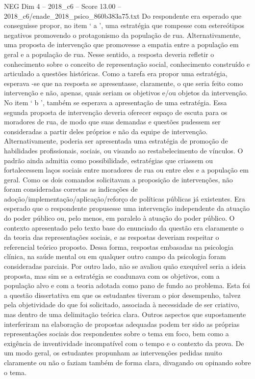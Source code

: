 \begin{textsample}{NEG Dim 4 – 2018\_c6 – Score 13.00 – 2018\_c6/enade\_2018\_psico\_860b383a75.txt}
Do respondente era esperado que conseguisse propor, no item ‘ a ’, uma estratégia que rompesse com estereótipos negativos promovendo o protagonismo da população de rua.
Alternativamente, uma proposta de intervenção que promovesse a empatia entre a população em geral e a população de rua.
Nesse sentido, a resposta deveria refletir o conhecimento sobre o conceito de representação social, conhecimento construído e articulado a questões históricas.
Como a tarefa era propor uma estratégia, esperava -se que na resposta se apresentasse, claramente, o que seria feito como intervenção e não, apenas, quais seriam os objetivos e/ou objetos da intervenção.
No item ‘ b ’, também se esperava a apresentação de uma estratégia.
Essa segunda proposta de intervenção deveria oferecer espaço de escuta para os moradores de rua, de modo que suas demandas e questões pudessem ser consideradas a partir deles próprios e não da equipe de intervenção.
Alternativamente, poderia ser apresentada uma estratégia de promoção de habilidades profissionais, sociais, ou visando ao restabelecimento de vínculos.
O padrão ainda admitia como possibilidade, estratégias que criassem ou fortalecessem laços sociais entre moradores de rua ou entre eles e a população em geral.
Como os dois comandos solicitavam a proposição de intervenções, não foram consideradas corretas as indicações de adoção/implementação/aplicação/reforço de políticas públicas já existentes.
Era esperado que o respondente propusesse uma intervenção independente da atuação do poder público ou, pelo menos, em paralelo à atuação do poder público.
O contexto apresentado pelo texto base do enunciado da questão era claramente o da teoria das representações sociais, e as respostas deveriam respeitar o referencial teórico proposto.
Dessa forma, respostas embasadas na psicologia clínica, na saúde mental ou em qualquer outro campo da psicologia foram consideradas parciais.
Por outro lado, não se avaliou quão exequível seria a ideia proposta, mas sim se a estratégia se coadunava com os objetivos, com a população alvo e com a teoria adotada como pano de fundo ao problema.
Esta foi a questão dissertativa em que os estudantes tiveram o pior desempenho, talvez pela objetividade do que foi solicitado, associada à necessidade de ser criativo, mas dentro de uma delimitação teórica clara.
Outros aspectos que supostamente interferiram na elaboração de propostas adequadas podem ter sido as próprias representações sociais dos respondentes sobre o tema em foco, bem como a exigência de inventividade incompatível com o tempo e o contexto da prova.
De um modo geral, os estudantes propunham as intervenções pedidas muito claramente ou não o faziam também de forma clara, divagando ou opinando sobre o tema.

\end{textsample}

